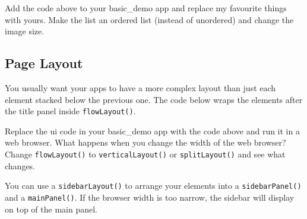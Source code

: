\documentclass[
  oneside]{book}
\newenvironment{Shaded}{\begin{snugshade}}{\end{snugshade}}
\newcommand{\AttributeTok}[1]{\textcolor[rgb]{0.77,0.63,0.00}{#1}}
\newcommand{\FunctionTok}[1]{\textcolor[rgb]{0.00,0.00,0.00}{#1}}
\newcommand{\NormalTok}[1]{#1}
\newcommand{\OtherTok}[1]{\textcolor[rgb]{0.56,0.35,0.01}{#1}}
\newcommand{\SpecialCharTok}[1]{\textcolor[rgb]{0.00,0.00,0.00}{#1}}
\newcommand{\StringTok}[1]{\textcolor[rgb]{0.31,0.60,0.02}{#1}}
\begin{document}
\begin{try}
Add the code above to your basic\_demo app and replace my favourite things with yours. Make the list an ordered list (instead of unordered) and change the image size.

\end{try}

\hypertarget{page-layout}{%
\subsection{Page Layout}\label{page-layout}}

You usually want your apps to have a more complex layout than just each element stacked below the previous one. The code below wraps the elements after the title panel inside \texttt{flowLayout}\texttt{()}.

\begin{Shaded}
\end{Shaded}

\begin{try}
Replace the ui code in your basic\_demo app with the code above and run it in a web browser. What happens when you change the width of the web browser? Change \texttt{flowLayout}\texttt{()} to \texttt{verticalLayout}\texttt{()} or \texttt{splitLayout}\texttt{()} and see what changes.

\end{try}

You can use a \texttt{sidebarLayout}\texttt{()} to arrange your elements into a \texttt{sidebarPanel}\texttt{()} and a \texttt{mainPanel}\texttt{()}. If the browser width is too narrow, the sidebar will display on top of the main panel.
\end{document}
